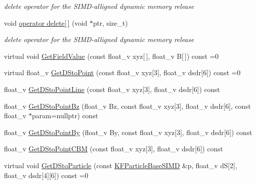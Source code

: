\begin{DoxyCompactItemize}
\begin{DoxyCompactList}\small\item\em delete operator for the S\+I\+M\+D-\/alligned dynamic memory release \end{DoxyCompactList}\item 
void \hyperlink{classKFParticleBaseSIMD_aead161ff9e6fc09d603794105177c503}{operator delete\mbox{[}$\,$\mbox{]}} (void $\ast$ptr, size\+\_\+t)\hypertarget{classKFParticleBaseSIMD_aead161ff9e6fc09d603794105177c503}{}\label{classKFParticleBaseSIMD_aead161ff9e6fc09d603794105177c503}

\begin{DoxyCompactList}\small\item\em delete operator for the S\+I\+M\+D-\/alligned dynamic memory release \end{DoxyCompactList}\item 
virtual void \hyperlink{classKFParticleBaseSIMD_a63891fb44fb5a375907e67a7d048d970}{Get\+Field\+Value} (const float\+\_\+v xyz\mbox{[}$\,$\mbox{]}, float\+\_\+v B\mbox{[}$\,$\mbox{]}) const =0
\item 
virtual float\+\_\+v \hyperlink{classKFParticleBaseSIMD_a762391583bafd7f932bc80fbd226bce5}{Get\+D\+Sto\+Point} (const float\+\_\+v xyz\mbox{[}3\mbox{]}, float\+\_\+v dsdr\mbox{[}6\mbox{]}) const =0
\item 
float\+\_\+v \hyperlink{classKFParticleBaseSIMD_abae627fc1bb1e7439826d12d14a6d379}{Get\+D\+Sto\+Point\+Line} (const float\+\_\+v xyz\mbox{[}3\mbox{]}, float\+\_\+v dsdr\mbox{[}6\mbox{]}) const 
\item 
float\+\_\+v \hyperlink{classKFParticleBaseSIMD_a1ebeaf16c037b7cbb1c8d05848be1fbe}{Get\+D\+Sto\+Point\+Bz} (float\+\_\+v Bz, const float\+\_\+v xyz\mbox{[}3\mbox{]}, float\+\_\+v dsdr\mbox{[}6\mbox{]}, const float\+\_\+v $\ast$param=nullptr) const 
\item 
float\+\_\+v \hyperlink{classKFParticleBaseSIMD_a59e8050469c4aa5bb1920d8426543b4b}{Get\+D\+Sto\+Point\+By} (float\+\_\+v By, const float\+\_\+v xyz\mbox{[}3\mbox{]}, float\+\_\+v dsdr\mbox{[}6\mbox{]}) const 
\item 
float\+\_\+v \hyperlink{classKFParticleBaseSIMD_a1dbb5988ec5d1507a2b6d229cf761eb4}{Get\+D\+Sto\+Point\+C\+BM} (const float\+\_\+v xyz\mbox{[}3\mbox{]}, float\+\_\+v dsdr\mbox{[}6\mbox{]}) const 
\item 
virtual void \hyperlink{classKFParticleBaseSIMD_af386cf32fdc113792305a1f38f2683c7}{Get\+D\+Sto\+Particle} (const \hyperlink{classKFParticleBaseSIMD}{K\+F\+Particle\+Base\+S\+I\+MD} \&p, float\+\_\+v dS\mbox{[}2\mbox{]}, float\+\_\+v dsdr\mbox{[}4\mbox{]}\mbox{[}6\mbox{]}) const =0

\end{DoxyCompactItemize}
